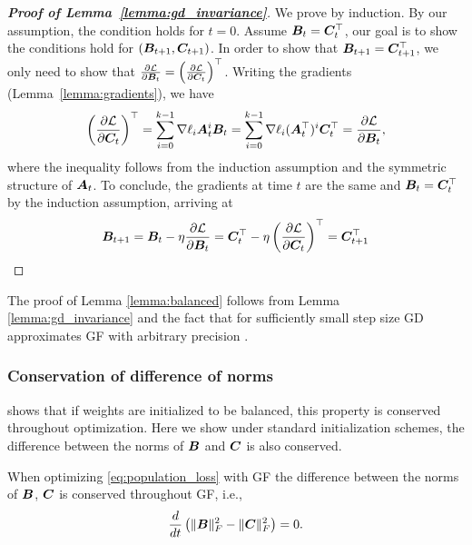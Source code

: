 \begin{proof}[\textbf{Proof of Lemma~\ref{lemma:gd_invariance}}]
We prove by induction. By our assumption, the condition holds for $t=0$. Assume ${\bm{B}}_t={\bm{C}}_t^\top$, our goal is to show the conditions hold for $({\bm{B}}_{t+1},{\bm{C}}_{t+1})$.
In order to show that ${\bm{B}}_{t+1}={\bm{C}}_{t+1}^\top$, we only need to show that $\frac{\partial \mathcal{L}}{\partial {\bm{B}}_t}=\left( \frac{\partial \mathcal{L}}{\partial {\bm{C}}_t} \right)^\top$. Writing the gradients (Lemma~\ref{lemma:gradients}), we have
\begin{equation}
    \left(\frac{\partial\mathcal{L}}{\partial {\bm{C}}_t}\right)^\top = \sum_{i=0}^{k-1}\nabla\ell_i {\bm{A}}_t^i{\bm{B}}_t =\sum_{i=0}^{k-1}\nabla\ell_i ({\bm{A}}_t^\top)^i {\bm{C}}_t^\top= \frac{\partial\mathcal{L}}{\partial {\bm{B}}_t},
\end{equation}
where the inequality follows from the induction assumption and the symmetric structure of ${\bm{A}}_t$. To conclude, the gradients at time $t$ are the same and ${\bm{B}}_t={\bm{C}}_t^\top$ by the induction assumption, arriving at
\begin{equation}
    {\bm{B}}_{t+1}={\bm{B}}_t-\eta\frac{\partial\mathcal{L}}{\partial {\bm{B}}_t}={\bm{C}}_t^\top - \eta \left(\frac{\partial\mathcal{L}}{\partial {\bm{C}}_t}\right)^\top={\bm{C}}_{t+1}^\top
\end{equation} 
\end{proof}


The proof of Lemma \ref{lemma:balanced} follows from Lemma \ref{lemma:gd_invariance} and the fact that for sufficiently small step size GD approximates GF with arbitrary precision  \citep[see Theorem 3 in][]{elkabetz2021continuous}.

\subsubsection{Conservation of difference of norms}\label{sec:apdx:conservation_of_norm_diff}

 shows that if weights are initialized to be balanced, this property is conserved throughout optimization. Here we show under standard initialization schemes, the difference between the norms of ${\bm{B}}$ and ${\bm{C}}$ is also conserved.

\begin{lemma}\label{lemma:preserve_norm_diff}
When optimizing \eqref{eq:population_loss} with GF the difference between the norms of ${\bm{B}}$, ${\bm{C}}$ is conserved throughout GF, i.e.,
\begin{equation}
    \frac{d}{dt}\left(\|{\bm{B}}\|_F^2 -  \|{\bm{C}}\|_F^2 \right) = 0.
\end{equation}
\end{lemma}

